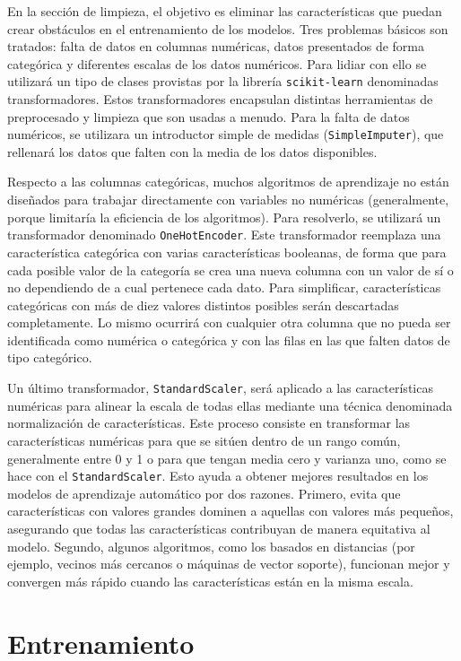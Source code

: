 En la sección de limpieza, el objetivo es eliminar las características que puedan crear obstáculos en el entrenamiento de los modelos. Tres problemas básicos son tratados: falta de datos en columnas numéricas, datos presentados de forma categórica y diferentes escalas de los datos numéricos. Para lidiar con ello se utilizará un tipo de clases provistas por la librería \texttt{scikit-learn} denominadas transformadores. Estos transformadores encapsulan distintas herramientas de preprocesado y limpieza que son usadas a menudo. Para la falta de datos numéricos, se utilizara un introductor simple de medidas (\texttt{SimpleImputer}), que rellenará los datos que falten con la media de los datos disponibles. 

Respecto a las columnas categóricas, muchos algoritmos de aprendizaje no están diseñados para trabajar directamente con variables no numéricas (generalmente, porque limitaría la eficiencia de los algoritmos). Para resolverlo, se utilizará un transformador denominado \texttt{OneHotEncoder}. Este transformador reemplaza una característica categórica con varias características booleanas, de forma que para cada posible valor de la categoría se crea una nueva columna con un valor de sí o no dependiendo de a cual pertenece cada dato. Para simplificar, características categóricas con más de diez valores distintos posibles serán descartadas completamente. Lo mismo ocurrirá con cualquier otra columna que no pueda ser identificada como numérica o categórica y con las filas en las que falten datos de tipo categórico.

Un último transformador, \texttt{StandardScaler}, será aplicado a las características numéricas para alinear la escala de todas ellas mediante una técnica denominada normalización de características. Este proceso consiste en transformar las características numéricas para que se sitúen dentro de un rango común, generalmente entre 0 y 1 o para que tengan media cero y varianza uno, como se hace con el \texttt{StandardScaler}. Esto ayuda a obtener mejores resultados en los modelos de aprendizaje automático por dos razones. Primero, evita que características con valores grandes dominen a aquellas con valores más pequeños, asegurando que todas las características contribuyan de manera equitativa al modelo. Segundo, algunos algoritmos, como los basados en distancias (por ejemplo, vecinos más cercanos o máquinas de vector soporte), funcionan mejor y convergen más rápido cuando las características están en la misma escala.


\section{Entrenamiento}

